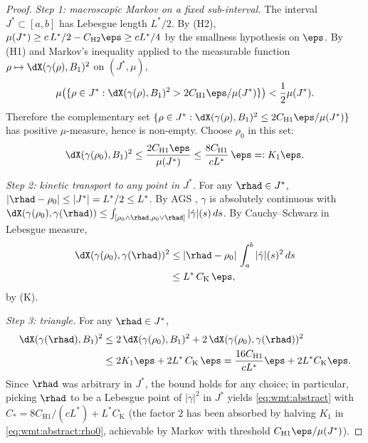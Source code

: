 \begin{proof}
\emph{Step 1: macroscopic Markov on a fixed sub-interval.} The interval
$J^*\subset[a,b]$ has Lebesgue length $L^*/2$. By (H2),
$\mu(J^*)\ge c\,L^*/2-C_{\mathrm H2}\eps\ge cL^*/4$ by the smallness
hypothesis on $\eps$. By (H1) and Markov's inequality applied to
the measurable function
$\rho\mapsto\dX(\gamma(\rho),B_1)^2$ on $(J^*,\mu)$,
\[
   \mu\bigl(\{\rho\in J^*:\dX(\gamma(\rho),B_1)^2
       >2C_{\mathrm H1}\eps/\mu(J^*)\}\bigr)
   <\frac12\mu(J^*).
\]
Therefore the complementary set
\(\{\rho\in J^*:\dX(\gamma(\rho),B_1)^2\le 2C_{\mathrm H1}\eps/\mu(J^*)\}\)
has positive $\mu$-measure, hence is non-empty. Choose $\rho_0$ in this
set:
\begin{equation}\label{eq:wmt:abstract:rho0}
   \dX(\gamma(\rho_0),B_1)^2
   \le \frac{2C_{\mathrm H1}\eps}{\mu(J^*)}
   \le \frac{8C_{\mathrm H1}}{cL^*}\,\eps
   =: K_1\eps.
\end{equation}

\emph{Step 2: kinetic transport to any point in $J^*$.} For any
$\rhad\in J^*$, $|\rhad-\rho_0|\le|J^*|=L^*/2\le L^*$. By
AGS \cite[Thm.~1.1.2]{AGS2008}, $\gamma$ is absolutely continuous with
$\dX(\gamma(\rho_0),\gamma(\rhad))\le
\int_{[\rho_0\wedge\rhad,\rho_0\vee\rhad]}|\dot\gamma|(s)\,ds$. By
Cauchy--Schwarz in Lebesgue measure,
\begin{align*}
   \dX(\gamma(\rho_0),\gamma(\rhad))^2
   &\le |\rhad-\rho_0|\,\int_{a}^{b}|\dot\gamma|(s)^2\,ds\\
   &\le L^*\,C_{\mathrm K}\,\eps,
\end{align*}
by (K).

\emph{Step 3: triangle.} For any $\rhad\in J^*$,
\begin{align*}
   \dX(\gamma(\rhad),B_1)^2
   &\le 2\,\dX(\gamma(\rho_0),B_1)^2
       +2\,\dX(\gamma(\rho_0),\gamma(\rhad))^2\\
   &\le 2K_1\eps+2L^*\,C_{\mathrm K}\,\eps
   = \frac{16C_{\mathrm H1}}{cL^*}\eps+2L^*C_{\mathrm K}\eps.
\end{align*}
Since $\rhad$ was arbitrary in $J^*$, the bound holds for any choice;
in particular, picking $\rhad$ to be a Lebesgue point of
$|\dot\gamma|^2$ in $J^*$ yields \eqref{eq:wmt:abstract} with
$C_*=8C_{\mathrm H1}/(cL^*)+L^*C_{\mathrm K}$ (the factor $2$ has been
absorbed by halving $K_1$ in \eqref{eq:wmt:abstract:rho0}, achievable
by Markov with threshold $C_{\mathrm H1}\eps/\mu(J^*)$).
\end{proof}

